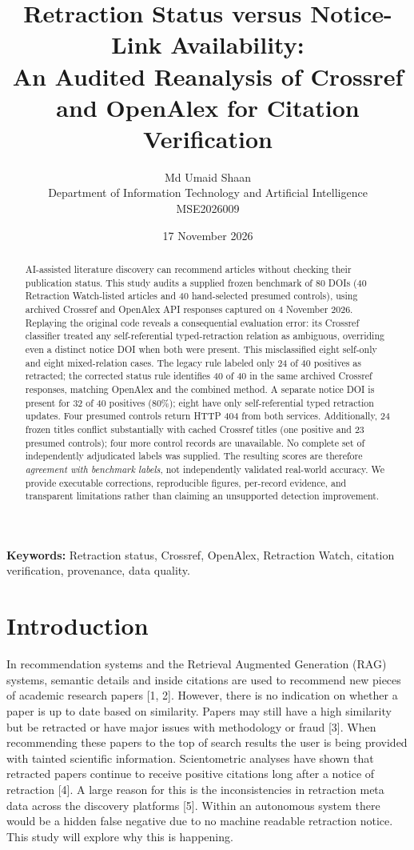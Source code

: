 \documentclass[10pt,a4paper,twocolumn]{article}
\title{\bfseries Retraction Status versus Notice-Link Availability:\\ \large An Audited Reanalysis of Crossref and OpenAlex for Citation Verification}
\author{Md Umaid Shaan\\ Department of Information Technology and Artificial Intelligence\\ MSE2026009}
\date{17 November 2026}
\begin{document}
\maketitle
\begin{abstract}
AI-assisted literature discovery can recommend articles without checking their publication status. This study audits a supplied frozen benchmark of 80 DOIs (40 Retraction Watch-listed articles and 40 hand-selected presumed controls), using archived Crossref and OpenAlex API responses captured on 4 November 2026. Replaying the original code reveals a consequential evaluation error: its Crossref classifier treated any self-referential typed-retraction relation as ambiguous, overriding even a distinct notice DOI when both were present. This misclassified eight self-only and eight mixed-relation cases. The legacy rule labeled only 24 of 40 positives as retracted; the corrected status rule identifies 40 of 40 in the same archived Crossref responses, matching OpenAlex and the combined method. A separate notice DOI is present for 32 of 40 positives (80\%); eight have only self-referential typed retraction updates. Four presumed controls return HTTP 404 from both services. Additionally, 24 frozen titles conflict substantially with cached Crossref titles (one positive and 23 presumed controls); four more control records are unavailable. No complete set of independently adjudicated labels was supplied. The resulting scores are therefore \emph{agreement with benchmark labels}, not independently validated real-world accuracy. We provide executable corrections, reproducible figures, per-record evidence, and transparent limitations rather than claiming an unsupported detection improvement.
\end{abstract}
\noindent\textbf{Keywords:} Retraction status, Crossref, OpenAlex, Retraction Watch, citation verification, provenance, data quality.

\section{Introduction}

In recommendation systems  and the Retrieval Augmented Generation (RAG) systems, semantic details and  inside citations are used  to recommend new pieces of academic research papers [1, 2]. However, there is no indication on whether a paper is up to date based on similarity. Papers may still have a high similarity but be retracted or have major issues with methodology or fraud [3]. When recommending these papers to the top of search results the user is being provided with tainted scientific information. Scientometric analyses have shown that retracted papers continue to receive positive citations long after a notice of retraction [4]. A large reason for this is the inconsistencies in retraction meta data across the discovery platforms [5]. Within an autonomous system there would be a hidden false negative due to no machine readable retraction notice. This study will explore why this is happening.
\end{document}
